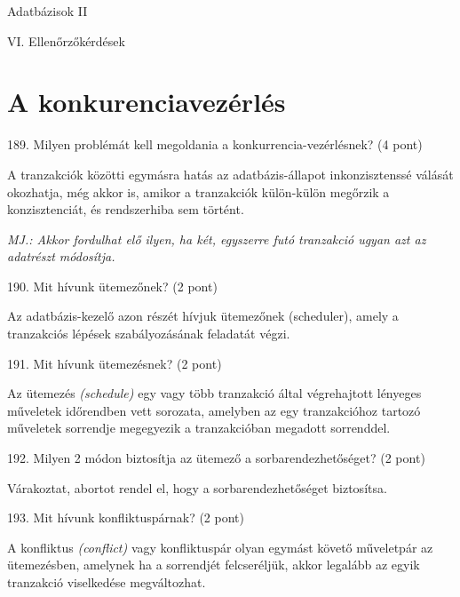 \documentclass[a4paper,11.5pt, table]{article}
\begin{document}
	\begin{center}
		{\Huge Adatbázisok II}
		\smallskip
		
		{\Large VI. Ellenőrzőkérdések}
	\end{center}

\section{A konkurenciavezérlés}

189. Milyen problémát kell megoldania a konkurrencia-vezérlésnek? (4 pont)
	\begin{compactitem}
		\item A tranzakciók közötti egymásra hatás az adatbázis-állapot inkonzisztenssé válását okozhatja, még akkor is, amikor a tranzakciók külön-külön megőrzik a konzisztenciát, és rendszerhiba sem történt. 
		\item \textit{MJ.: Akkor fordulhat elő ilyen, ha két, egyszerre futó tranzakció ugyan azt az adatrészt módosítja.}
	\end{compactitem}

190. Mit hívunk ütemezőnek? (2 pont)
	\begin{compactitem}
		\item Az adatbázis-kezelő azon részét hívjuk ütemezőnek (scheduler), amely a tranzakciós lépések szabályozásának feladatát végzi.
	\end{compactitem}

191. Mit hívunk ütemezésnek? (2 pont)
	\begin{compactitem}
		\item Az ütemezés \textit{(schedule)} egy vagy több tranzakció által végrehajtott lényeges műveletek időrendben vett sorozata, amelyben az egy tranzakcióhoz tartozó műveletek sorrendje megegyezik a tranzakcióban megadott sorrenddel. 
	\end{compactitem}

192. Milyen 2 módon biztosítja az ütemező a sorbarendezhetőséget? (2 pont)
	\begin{compactitem}
		\item Várakoztat, abortot rendel el, hogy a sorbarendezhetőséget biztosítsa.
	\end{compactitem}

193. Mit hívunk konfliktuspárnak? (2 pont)
	\begin{compactitem}
		\item A konfliktus \textit{(conflict)} vagy konfliktuspár olyan egymást követő műveletpár az ütemezésben, amelynek ha a sorrendjét felcseréljük, akkor legalább az egyik tranzakció viselkedése megváltozhat.
	\end{compactitem}
\end{document}
